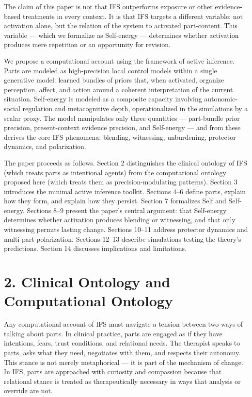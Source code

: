 \documentclass[11pt]{article}
\begin{document}
The claim of this paper is not that IFS outperforms exposure or other
evidence-based treatments in every context. It is that IFS targets a
different variable: not activation alone, but the relation of the system
to activated part-content. This variable --- which we formalize as
Self-energy --- determines whether activation produces mere repetition
or an opportunity for revision.

We propose a computational account using the framework of active
inference. Parts are modeled as high-precision local control models
within a single generative model: learned bundles of priors that, when
activated, organize perception, affect, and action around a coherent
interpretation of the current situation. Self-energy is modeled as a
composite capacity involving autonomic-social regulation and
metacognitive depth, operationalized in the simulations by a scalar
proxy. The model manipulates only three quantities --- part-bundle prior
precision, present-context evidence precision, and Self-energy --- and
from these derives the core IFS phenomena: blending, witnessing,
unburdening, protector dynamics, and polarization.

The paper proceeds as follows. Section 2 distinguishes the clinical
ontology of IFS (which treats parts as intentional agents) from the
computational ontology proposed here (which treats them as
precision-modulating patterns). Section 3 introduces the minimal active
inference toolkit. Sections 4--6 define parts, explain how they form,
and explain how they persist. Section 7 formalizes Self and Self-energy.
Sections 8--9 present the paper's central argument: that Self-energy
determines whether activation produces blending or witnessing, and that
only witnessing permits lasting change. Sections 10--11 address
protector dynamics and multi-part polarization. Sections 12--13 describe
simulations testing the theory's predictions. Section 14 discusses
implications and limitations.

\section{2. Clinical Ontology and Computational
Ontology}\label{clinical-ontology-and-computational-ontology}

Any computational account of IFS must navigate a tension between two
ways of talking about parts. In clinical practice, parts are engaged as
if they have intentions, fears, trust conditions, and relational needs.
The therapist speaks to parts, asks what they need, negotiates with
them, and respects their autonomy. This stance is not merely
metaphorical --- it is part of the mechanism of change. In IFS, parts
are approached with curiosity and compassion because that relational
stance is treated as therapeutically necessary in ways that analysis or
override are not.
\end{document}
